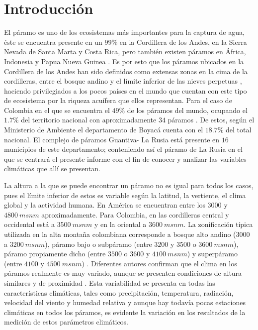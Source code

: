 \documentclass[conference,final,]{IEEEtran}
\begin{document}
\hypertarget{introducciuxf3n}{%
\section{Introducción}\label{introducciuxf3n}}

El páramo es uno de los ecosistemas más importantes para la captura de
agua, éste se encuentra presente en un \(99 \%\) en la Cordillera de los
Andes, en la Sierra Nevada de Santa Marta y Costa Rica, pero también
existen páramos en África, Indonesia y Papua Nueva Guinea
\cite{cabrera}. Es por esto que los páramos ubicados en la Cordillera de
los Andes han sido definidos como extensas zonas en la cima de la
cordilleras, entre el bosque andino y el límite inferior de las nieves
perpetuas \cite{cabrera}, haciendo privilegiados a los pocos países en
el mundo que cuentan con este tipo de ecosistema por la riqueza acuífera
que ellos representan. Para el caso de Colombia en el que se encuentra
el \(49 \%\) de los páramos del mundo, ocupando el \(1.7 \%\) del
territorio nacional con aproximadamente \(34\) páramos \cite{cabrera}.
De estos, según el Ministerio de Ambiente el departamento de Boyacá
cuenta con el \(18.7 \%\) del total nacional. El complejo de páramos
Guantiva- La Rusia está presente en \(16\) municipios de este
departamento; conteniendo así el páramo de La Rusia en el que se
centrará el presente informe con el fin de conocer y analizar las
variables climáticas que allí se presentan.

La altura a la que se puede encontrar un páramo no es igual para todos
los casos, pues el límite inferior de estos es variable según la
latitud, la vertiente, el clima global y la actividad humana. En América
se encuentran entre los \(3000\) y \(4800 \ msnm\) aproximadamente. Para
Colombia, en las cordilleras central y occidental está a \(3500 \ msnm\)
y en la oriental a \(3600 \ msnm\). La zonificación típica utilizada en
la alta montaña colombiana corresponde a bosque alto andino (\(3000\) a
\(3200 \ msnm\)), páramo bajo o subpáramo (entre \(3200\) y \(3500\) o
\(3600 \ msnm\)), páramo propiamente dicho (entre \(3500\) o \(3600\) y
\(4100 \ msnm\)) y superpáramo (entre \(4100\) y \(4500 \ msnm\))
\cite{ortizparamos}. Diferentes autores confirman que el clima en los
páramos realmente es muy variado, aunque se presenten condiciones de
altura similares y de proximidad \cite{paramos}. Esta variabilidad se
presenta en todas las características climáticas, tales como
precipitación, temperatura, radiación, velocidad del viento y humedad
relativa y aunque hay todavía pocas estaciones climáticas en todos los
páramos, es evidente la variación en los resultados de la medición de
estos parámetros climáticos.
\end{document}
